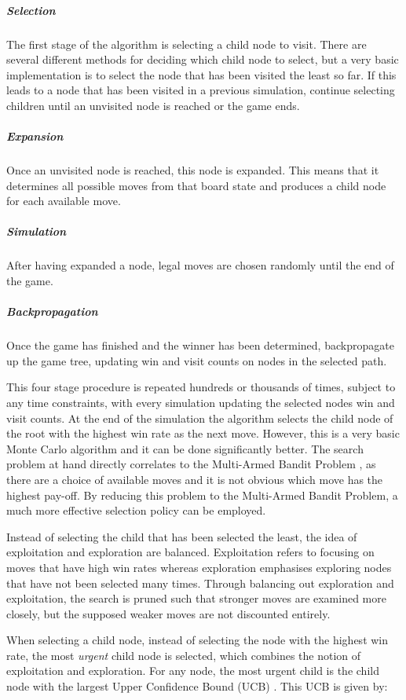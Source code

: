 \documentclass[12pt,a4paper]{article}
\begin{document}
\subparagraph{Selection}

The first stage of the algorithm is selecting a child node to visit. There are several different methods for deciding which child node to select, but a very basic implementation is to select the node that has been visited the least so far. If this leads to a node that has been visited in a previous simulation, continue selecting children until an unvisited node is reached or the game ends. 

\subparagraph{Expansion}

Once an unvisited node is reached, this node is expanded. This means that it determines all possible moves from that board state and produces a child node for each available move.

\subparagraph{Simulation}

After having expanded a node, legal moves are chosen randomly until the end of the game.

\subparagraph{Backpropagation}

Once the game has finished and the winner has been determined, backpropagate up the game tree, updating win and visit counts on nodes in the selected path.

\bigskip


This four stage procedure is repeated hundreds or thousands of times, subject to any time constraints, with every simulation updating the selected nodes win and visit counts. At the end of the simulation the algorithm selects the child node of the root with the highest win rate as the next move. However, this is a very basic Monte Carlo algorithm and it can be done significantly better. The search problem at hand directly correlates to the Multi-Armed Bandit Problem \cite{auer2002finite}, as there are a choice of available moves and it is not obvious which move has the highest pay-off. By reducing this problem to the Multi-Armed Bandit Problem, a much more effective selection policy can be employed. 

Instead of selecting the child that has been selected the least, the idea of exploitation and exploration are balanced. Exploitation refers to focusing on moves that have high win rates whereas exploration emphasises exploring nodes that have not been selected many times. Through balancing out exploration and exploitation, the search is pruned such that stronger moves are examined more closely, but the supposed weaker moves are not discounted entirely.

When selecting a child node, instead of selecting the node with the highest win rate, the most \textit{urgent} child node is selected, which combines the notion of exploitation and exploration. For any node, the most urgent child is the child node with the largest Upper Confidence Bound (UCB) \cite{browne2012survey}. This UCB is given by:
\end{document}
